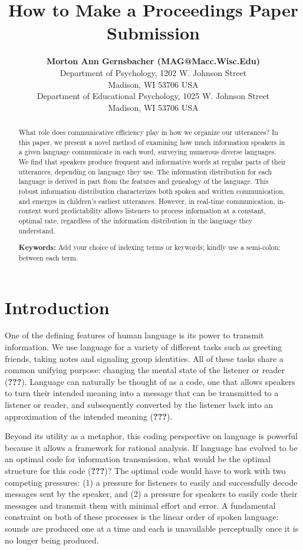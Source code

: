 \documentclass[10pt, letterpaper]{article}
\title{How to Make a Proceedings Paper Submission}
\author{{\large \bf Morton Ann Gernsbacher (MAG@Macc.Wisc.Edu)} \\ Department of Psychology, 1202 W. Johnson Street \\ Madison, WI 53706 USA \AND {\large \bf Sharon J.~Derry (SDJ@Macc.Wisc.Edu)} \\ Department of Educational Psychology, 1025 W. Johnson Street \\ Madison, WI 53706 USA}
\begin{document}
\maketitle

\begin{abstract}
What role does communicative efficiency play in how we organize our
utterances? In this paper, we present a novel method of examining how
much information speakers in a given language communicate in each word,
surveying numerous diverse languages. We find that speakers produce
frequent and informative words at regular parts of their utterances,
depending on language they use. The information distribution for each
language is derived in part from the features and genealogy of the
language. This robust information distribution characterizes both spoken
and written communication, and emerges in children's earliest
utterances. However, in real-time communication, in-context word
predictability allows listeners to process information at a constant,
optimal rate, regardless of the information distribution in the language
they understand.

\textbf{Keywords:}
Add your choice of indexing terms or keywords; kindly use a semi-colon;
between each term.
\end{abstract}

\hypertarget{introduction}{%
\section{Introduction}\label{introduction}}

One of the defining features of human language is its power to transmit
information. We use language for a variety of different tasks such as
greeting friends, taking notes and signaling group identities. All of
these tasks share a common unifying purpose: changing the mental state
of the listener or reader ({\textbf{???}}). Language can naturally be
thought of as a code, one that allows speakers to turn their intended
meaning into a message that can be transmitted to a listener or reader,
and subsequently converted by the listener back into an approximation of
the intended meaning ({\textbf{???}}).

Beyond its utility as a metaphor, this coding perspective on language is
powerful because it allows a framework for rational analysis. If
language has evolved to be an optimal code for information transmission,
what would be the optimal structure for this code ({\textbf{???}})? The
optimal code would have to work with two competing pressures: (1) a
pressure for listeners to easily and successfully decode messages sent
by the speaker, and (2) a pressure for speakers to easily code their
messages and transmit them with minimal effort and error. A fundamental
constraint on both of these processes is the linear order of spoken
language: sounds are produced one at a time and each is unavailable
perceptually once it is no longer being produced.
\end{document}
